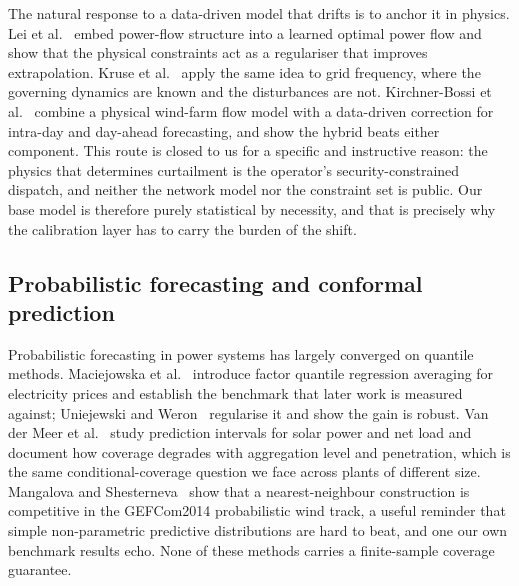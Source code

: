 \documentclass[preprint,3p,times]{elsarticle}
\providecommand{\DIFaddtex}[1]{{\protect\color{blue} \sf #1}} %
\providecommand{\DIFadd}[1]{\texorpdfstring{\DIFaddtex{#1}}{#1}} %
\begin{document}
\DIFadd{The natural response to a data-driven model that drifts is to anchor it in physics. Lei et al.~\cite{lei2021} embed power-flow structure into a learned optimal power flow and show that the physical constraints act as a regulariser that improves extrapolation. Kruse et al.~\cite{kruse2023} apply the same idea to grid frequency, where the governing dynamics are known and the disturbances are not. Kirchner-Bossi et al.~\cite{kirchnerbossi2024} combine a physical wind-farm flow model with a data-driven correction for intra-day and day-ahead forecasting, and show the hybrid beats either component. This route is closed to us for a specific and instructive reason: the physics that determines curtailment is the operator's security-constrained dispatch, and neither the network model nor the constraint set is public. Our base model is therefore purely statistical by necessity, and that is precisely why the calibration layer has to carry the burden of the shift.
}

\subsection{Probabilistic forecasting and conformal prediction}

\DIFadd{Probabilistic forecasting in power systems has largely converged on quantile methods. Maciejowska et al.~\cite{maciejowska2016} introduce factor quantile regression averaging for electricity prices and establish the benchmark that later work is measured against; Uniejewski and Weron~\cite{uniejewski2021} regularise it and show the gain is robust. Van der Meer et al.~\cite{vandermeer2018} study prediction intervals for solar power and net load and document how coverage degrades with aggregation level and penetration, which is the same conditional-coverage question we face across plants of different size. Mangalova and Shesterneva~\cite{mangalova2016} show that a nearest-neighbour construction is competitive in the GEFCom2014 probabilistic wind track, a useful reminder that simple non-parametric predictive distributions are hard to beat, and one our own benchmark results echo. None of these methods carries a finite-sample coverage guarantee.
}
\end{document}
